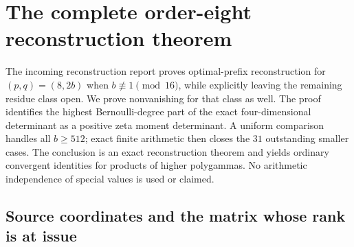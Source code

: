 \documentclass[11pt,a4paper]{article}
\numberwithin{equation}{section}
\theoremstyle{plain}
\theoremstyle{definition}
\theoremstyle{remark}
\begin{document}


\section{The complete order-eight reconstruction theorem}
\label{r8c:section}

The incoming reconstruction report \cite[Section 5]{Reconstruction} proves
optimal-prefix reconstruction for $(p,q)=(8,2b)$ when
$b\not\equiv1\pmod {16}$, while explicitly leaving the remaining
residue class open. We prove nonvanishing for that class as well.
The proof identifies the highest Bernoulli-degree part of the exact
four-dimensional determinant as a positive zeta moment determinant.
A uniform comparison handles all $b\ge512$; exact finite arithmetic
then closes the $31$ outstanding smaller cases. The conclusion is an
exact reconstruction theorem and yields ordinary convergent identities
for products of higher polygammas. No arithmetic independence of
special values is used or claimed.

\subsection{Source coordinates and the matrix whose rank is at issue}
\end{document}

